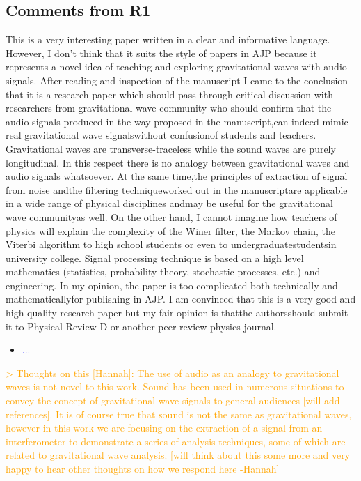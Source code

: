 \documentclass{article}
\newcommand{\todo}{\textcolor{blue}}
\newcommand{\han}{\textcolor{orange}}
\begin{document}
\subsection{Comments from R1 }

This is a very interesting paper written in a clear and informative language. However, I don’t think that it suits the style of papers in AJP because it represents a novel idea of teaching and exploring gravitational waves with audio signals. After reading and inspection of the manuscript I came to the  conclusion  that it is a  research  paper  which should pass  through critical discussion  with researchers  from gravitational  wave  community who  should  confirm  that  the audio signals produced in the way proposed in the manuscript,can indeed mimic real gravitational wave signalswithout confusionof students and teachers. Gravitational waves are transverse-traceless while the sound waves are purely longitudinal. In this respect there is no analogy between gravitational waves and audio signals whatsoever. At the same time,the principles of extraction of signal from noise andthe filtering techniqueworked out in the manuscriptare applicable in a wide range of physical disciplines andmay be useful for the gravitational wave communityas well. On the other hand, I cannot imagine how teachers of physics will explain the complexity of the Winer filter, the Markov chain, the Viterbi algorithm to high school students or even to undergraduatestudentsin university college. Signal  processing technique is based  on a  high  level  mathematics (statistics, probability theory, stochastic processes, etc.) and engineering. In my opinion, the paper is too complicated both technically and mathematicallyfor publishing in AJP. I am convinced that this is a very good and high-quality research  paper but  my  fair  opinion  is  thatthe authorsshould submit  it  to  Physical Review D or another peer-review physics journal. 
\begin{itemize}
\item \todo{...}
\end{itemize}



\han{> Thoughts on this [Hannah]: The use of audio as an analogy to gravitational waves is not novel to this work. Sound has been used in numerous situations to convey the concept of gravitational wave signals to general audiences [will add references]. It is of course true that sound is not the same as gravitational waves, however in this work we are focusing on the extraction of a signal from an interferometer to demonstrate a series of analysis techniques, some of which are related to gravitational wave analysis. [will think about this some more and very happy to hear other thoughts on how we respond here -Hannah]}
\end{document}
